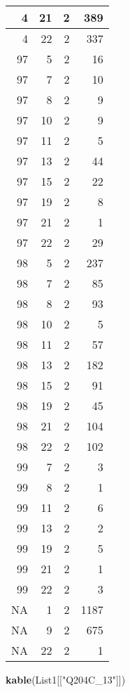 \documentclass[]{article}
\newenvironment{Shaded}{\begin{snugshade}}{\end{snugshade}}
\newcommand{\KeywordTok}[1]{\textcolor[rgb]{0.13,0.29,0.53}{\textbf{#1}}}
\newcommand{\NormalTok}[1]{#1}
\newcommand{\StringTok}[1]{\textcolor[rgb]{0.31,0.60,0.02}{#1}}
\begin{document}
\begin{tabular}{r|r|r|r}
\hline
4 & 21 & 2 & 389\\
\hline
4 & 22 & 2 & 337\\
\hline
97 & 5 & 2 & 16\\
\hline
97 & 7 & 2 & 10\\
\hline
97 & 8 & 2 & 9\\
\hline
97 & 10 & 2 & 9\\
\hline
97 & 11 & 2 & 5\\
\hline
97 & 13 & 2 & 44\\
\hline
97 & 15 & 2 & 22\\
\hline
97 & 19 & 2 & 8\\
\hline
97 & 21 & 2 & 1\\
\hline
97 & 22 & 2 & 29\\
\hline
98 & 5 & 2 & 237\\
\hline
98 & 7 & 2 & 85\\
\hline
98 & 8 & 2 & 93\\
\hline
98 & 10 & 2 & 5\\
\hline
98 & 11 & 2 & 57\\
\hline
98 & 13 & 2 & 182\\
\hline
98 & 15 & 2 & 91\\
\hline
98 & 19 & 2 & 45\\
\hline
98 & 21 & 2 & 104\\
\hline
98 & 22 & 2 & 102\\
\hline
99 & 7 & 2 & 3\\
\hline
99 & 8 & 2 & 1\\
\hline
99 & 11 & 2 & 6\\
\hline
99 & 13 & 2 & 2\\
\hline
99 & 19 & 2 & 5\\
\hline
99 & 21 & 2 & 1\\
\hline
99 & 22 & 2 & 3\\
\hline
NA & 1 & 2 & 1187\\
\hline
NA & 9 & 2 & 675\\
\hline
NA & 22 & 2 & 1\\
\hline
\end{tabular}

\begin{Shaded}
\begin{Highlighting}[]
\KeywordTok{kable}\NormalTok{(List1[[}\StringTok{"Q204C_13"}\NormalTok{]])}
\end{Highlighting}
\end{Shaded}
\end{document}

